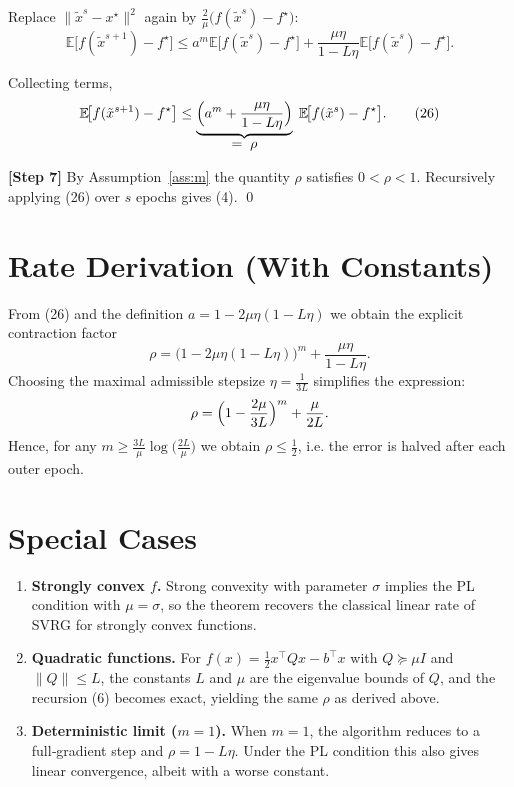 \documentclass[11pt]{article}
\newcommand{\EE}{\mathbb{E}}
\begin{document}
Replace $\|\tilde{x}^{s}-x^{\star}\|^{2}$ again by $ \frac{2}{\mu}\bigl(f(\tilde{x}^{s})-f^{\star}\bigr)$:
\[
\EE\!\bigl[f(\tilde{x}^{s+1})-f^{\star}\bigr]
\le a^{m}\EE\!\bigl[f(\tilde{x}^{s})-f^{\star}\bigr]
+\frac{\mu\eta}{1-L\eta}\EE\!\bigl[f(\tilde{x}^{s})-f^{\star}\bigr]. \tag{25}
\]

Collecting terms,
\[
\EE\!\bigl[f(\tilde{x}^{s+1})-f^{\star}\bigr]
\le\underbrace{\Bigl(a^{m}+\frac{\mu\eta}{1-L\eta}\Bigr)}_{\displaystyle =\;\rho}\;
\EE\!\bigl[f(\tilde{x}^{s})-f^{\star}\bigr]. \tag{26}
\]

\textbf{[Step 7]}  By Assumption~\ref{ass:m} the quantity $\rho$ satisfies $0<\rho<1$. Recursively applying (26) over $s$ epochs gives (4). \qed

\section*{Rate Derivation (With Constants)}
From (26) and the definition $a=1-2\mu\eta(1-L\eta)$ we obtain the explicit contraction factor
\[
\rho
= \bigl(1-2\mu\eta(1-L\eta)\bigr)^{m} + \frac{\mu\eta}{1-L\eta}.
\]
Choosing the maximal admissible stepsize $\eta=\frac{1}{3L}$ simplifies the expression:
\[
\rho
= \Bigl(1-\frac{2\mu}{3L}\Bigr)^{m} + \frac{\mu}{2L}.
\]
Hence, for any $m\ge \frac{3L}{\mu}\log\!\bigl(\frac{2L}{\mu}\bigr)$ we obtain $\rho\le \frac{1}{2}$, i.e. the error is halved after each outer epoch.

\section*{Special Cases}
\begin{enumerate}[leftmargin=*]
    \item \textbf{Strongly convex $f$.} Strong convexity with parameter $\sigma$ implies the PL condition with $\mu=\sigma$, so the theorem recovers the classical linear rate of SVRG for strongly convex functions.
    \item \textbf{Quadratic functions.} For $f(x)=\frac{1}{2}x^{\top}Qx-b^{\top}x$ with $Q\succeq \mu I$ and $\|Q\|\le L$, the constants $L$ and $\mu$ are the eigenvalue bounds of $Q$, and the recursion (6) becomes exact, yielding the same $\rho$ as derived above.
    \item \textbf{Deterministic limit ($m=1$).} When $m=1$, the algorithm reduces to a full‑gradient step and $\rho=1-L\eta$. Under the PL condition this also gives linear convergence, albeit with a worse constant.
\end{enumerate}
\end{document}
